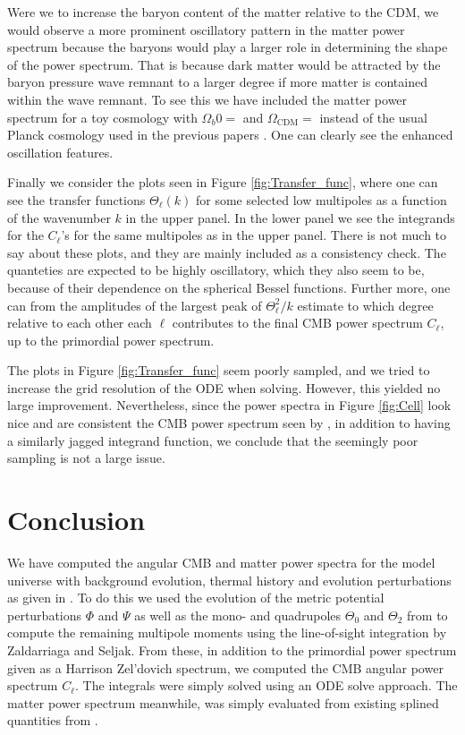 \documentclass[twocolumn]{aastex62}
\begin{document}
Were we to increase the baryon content of the matter relative to the CDM, we would observe a more prominent oscillatory pattern in the matter power spectrum because the baryons would play a larger role in determining the shape of the power spectrum. That is because dark matter would be attracted by the baryon pressure wave remnant to a larger degree if more matter is contained within the wave remnant. To see this we have included the matter power spectrum for a toy cosmology with $\Omega_b0 = $ and $\Omega_\mathrm{CDM} = $ instead of the usual Planck cosmology used in the previous papers \cite{stutzer:2020a, stutzer:2020b, stutzer:2020c}. One can clearly see the enhanced oscillation features.

Finally we consider the plots seen in Figure \ref{fig:Transfer_func}, where one can see the transfer functions $\Theta_\ell(k)$ for some selected low multipoles as a function of the wavenumber $k$ in the upper panel. In the lower panel we see the integrands for the $C_\ell$'s for the same multipoles as in the upper panel. There is not much to say about these plots, and they are mainly included as a consistency check. The quanteties are expected to be highly oscillatory, which they also seem to be, because of their dependence on the spherical Bessel functions. Further more, one can from the amplitudes of the largest peak of $\Theta_\ell^2 / k$ estimate to which degree relative to each other each $\ell$ contributes to the final CMB power spectrum $C_\ell$, up to the primordial power spectrum. 

The plots in Figure \ref{fig:Transfer_func} seem poorly sampled, and we tried to increase the grid resolution of the ODE when solving. However, this yielded no large improvement. Nevertheless, since the power spectra in Figure \ref{fig:Cell} look nice and are consistent the CMB power spectrum seen by \cite{callin:2006}, in addition to \cite{callin:2006} having a similarly jagged integrand function, we conclude that the seemingly poor sampling is not a large issue.


\section{Conclusion} \label{sec:Conclusion}
We have computed the angular CMB and matter power spectra for the model universe with background evolution, thermal history and evolution perturbations as given in \cite{stutzer:2020a, stutzer:2020b, stutzer:2020c}. To do this we used the evolution of the metric potential perturbations $\Phi$ and $\Psi$ as well as the mono- and quadrupoles $\Theta_0$ and $\Theta_2$ from \cite{stutzer:2020c} to compute the remaining multipole moments using the line-of-sight integration by Zaldarriaga and Seljak. From these, in addition to the primordial power spectrum given as a Harrison Zel'dovich spectrum, we computed the CMB angular power spectrum $C_\ell$. The integrals were simply solved using an ODE solve approach. The matter power spectrum meanwhile, was simply evaluated from existing splined quantities from \cite{stutzer:2020c}. 
\end{document}
